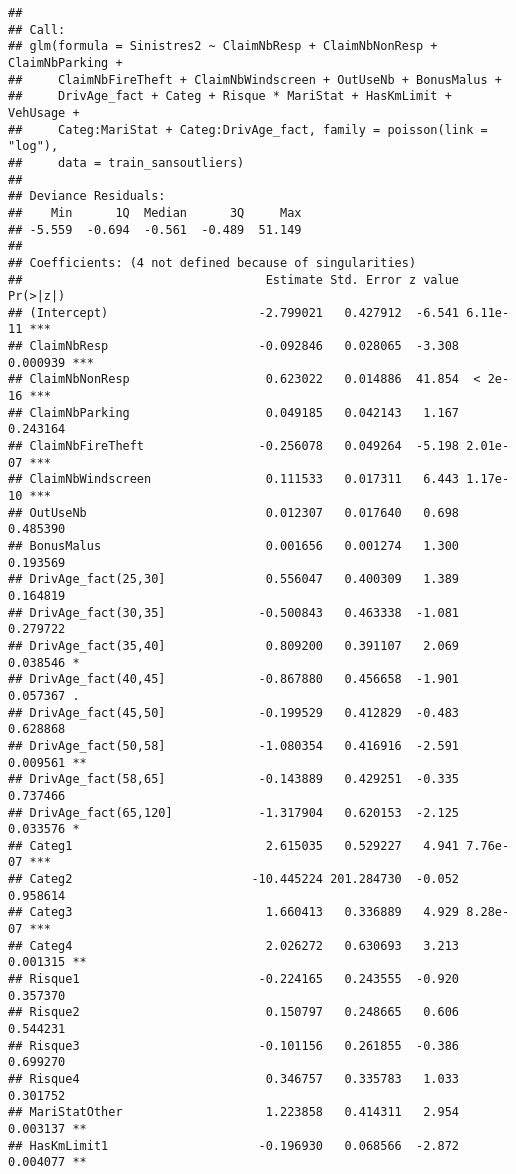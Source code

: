 \documentclass[
]{article}
\begin{document}
\begin{verbatim}
## 
## Call:
## glm(formula = Sinistres2 ~ ClaimNbResp + ClaimNbNonResp + ClaimNbParking + 
##     ClaimNbFireTheft + ClaimNbWindscreen + OutUseNb + BonusMalus + 
##     DrivAge_fact + Categ + Risque * MariStat + HasKmLimit + VehUsage + 
##     Categ:MariStat + Categ:DrivAge_fact, family = poisson(link = "log"), 
##     data = train_sansoutliers)
## 
## Deviance Residuals: 
##    Min      1Q  Median      3Q     Max  
## -5.559  -0.694  -0.561  -0.489  51.149  
## 
## Coefficients: (4 not defined because of singularities)
##                                  Estimate Std. Error z value Pr(>|z|)    
## (Intercept)                     -2.799021   0.427912  -6.541 6.11e-11 ***
## ClaimNbResp                     -0.092846   0.028065  -3.308 0.000939 ***
## ClaimNbNonResp                   0.623022   0.014886  41.854  < 2e-16 ***
## ClaimNbParking                   0.049185   0.042143   1.167 0.243164    
## ClaimNbFireTheft                -0.256078   0.049264  -5.198 2.01e-07 ***
## ClaimNbWindscreen                0.111533   0.017311   6.443 1.17e-10 ***
## OutUseNb                         0.012307   0.017640   0.698 0.485390    
## BonusMalus                       0.001656   0.001274   1.300 0.193569    
## DrivAge_fact(25,30]              0.556047   0.400309   1.389 0.164819    
## DrivAge_fact(30,35]             -0.500843   0.463338  -1.081 0.279722    
## DrivAge_fact(35,40]              0.809200   0.391107   2.069 0.038546 *  
## DrivAge_fact(40,45]             -0.867880   0.456658  -1.901 0.057367 .  
## DrivAge_fact(45,50]             -0.199529   0.412829  -0.483 0.628868    
## DrivAge_fact(50,58]             -1.080354   0.416916  -2.591 0.009561 ** 
## DrivAge_fact(58,65]             -0.143889   0.429251  -0.335 0.737466    
## DrivAge_fact(65,120]            -1.317904   0.620153  -2.125 0.033576 *  
## Categ1                           2.615035   0.529227   4.941 7.76e-07 ***
## Categ2                         -10.445224 201.284730  -0.052 0.958614    
## Categ3                           1.660413   0.336889   4.929 8.28e-07 ***
## Categ4                           2.026272   0.630693   3.213 0.001315 ** 
## Risque1                         -0.224165   0.243555  -0.920 0.357370    
## Risque2                          0.150797   0.248665   0.606 0.544231    
## Risque3                         -0.101156   0.261855  -0.386 0.699270    
## Risque4                          0.346757   0.335783   1.033 0.301752    
## MariStatOther                    1.223858   0.414311   2.954 0.003137 ** 
## HasKmLimit1                     -0.196930   0.068566  -2.872 0.004077 ** 

\end{verbatim}
\end{document}
